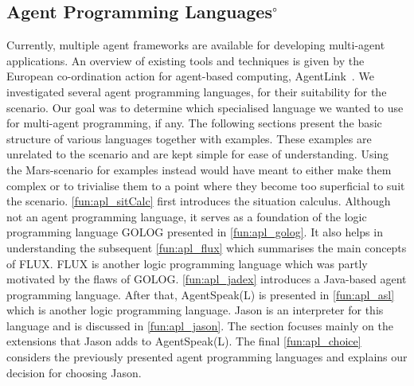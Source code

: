 \subsection[Agent Programming Languages]{Agent Programming Languages$^\circ$}
Currently, multiple agent frameworks are available for developing multi-agent applications.
An overview of existing tools and techniques is given by the European co-ordination action for agent-based computing, AgentLink~\cite{Mangina}. %
We investigated several agent programming languages, for their suitability for the \mars scenario.
Our goal was to determine which specialised language we wanted to use for multi-agent programming, if any.
The following sections present the basic structure of various languages together with examples.
These examples are unrelated to the \mars scenario and are kept simple for ease of understanding.
Using the Mars-scenario for examples instead would have meant to either make them complex or to trivialise them to a point where they become too superficial to suit the scenario.
\autoref{fun:apl_sitCalc} first introduces the situation calculus.
Although not an agent programming language, it serves as a foundation of the logic programming language GOLOG presented in \autoref{fun:apl_golog}.
It also helps in understanding the subsequent \autoref{fun:apl_flux} which summarises the main concepts of FLUX.
FLUX is another logic programming language which was partly motivated by the flaws of GOLOG.
\autoref{fun:apl_jadex} introduces a Java-based agent programming language.
After that, AgentSpeak(L) is presented in \autoref{fun:apl_asl} which is another logic programming language.
Jason is an interpreter for this language and is discussed in \autoref{fun:apl_jason}.
The section focuses mainly on the extensions that Jason adds to AgentSpeak(L).
The final \autoref{fun:apl_choice} considers the previously presented agent programming languages and explains our decision for choosing Jason.















